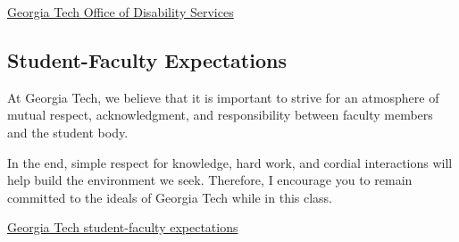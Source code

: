 \documentclass[11pt]{article}
\begin{document}
\href{http://disabilityservices.gatech.edu/}{Georgia Tech Office of Disability Services}

\subsection*{Student-Faculty Expectations}

At Georgia Tech, we believe that it is important to strive for an atmosphere of mutual respect, acknowledgment, and responsibility between faculty members and the student body.

In the end, simple respect for knowledge, hard work, and cordial interactions will help build the environment we seek. Therefore, I encourage you to remain committed to the ideals of Georgia Tech while in this class.

\href{http://www.catalog.gatech.edu/rules/22/}{Georgia Tech student-faculty expectations}
\end{document}
